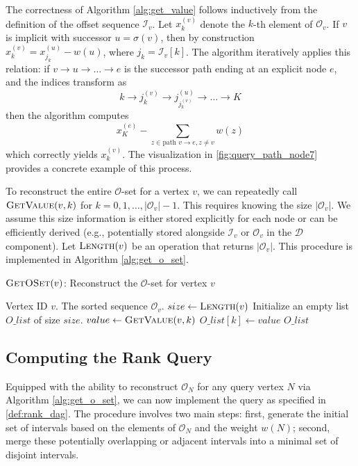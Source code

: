 The correctness of Algorithm \ref{alg:get_value} follows inductively from the definition of the offset sequence $\mathcal{I}_v$. Let $x_k^{(v)}$ denote the $k$-th element of $\mathcal{O}_v$. If $v$ is implicit with successor $u = \sigma(v)$, then by construction $x_k^{(v)} = x_{j_k}^{(u)} - w(u)$, where $j_k = \mathcal{I}_v[k]$. The algorithm iteratively applies this relation: if $v \to u \to \dots \to e$ is the successor path ending at an explicit node $e$, and the indices transform as
\[ k \to j_k^{(v)} \to j_{j_k^{(v)}}^{(u)} \to \dots \to K \]
then the algorithm computes
\[x_K^{(e)} - \sum_{z \in \text{path } v \to e, z \neq v} w(z)\]
which correctly yields $x_k^{(v)}$. The visualization in \autoref{fig:query_path_node7} provides a concrete example of this process.

To reconstruct the entire $\mathcal{O}$-set for a vertex $v$, we can repeatedly call $\textsc{GetValue}(v, k)$ for $k=0, 1, \dots, |\mathcal{O}_v|-1$. This requires knowing the size $|\mathcal{O}_v|$. We assume this size information is either stored explicitly for each node or can be efficiently derived (e.g., potentially stored alongside $\mathcal{I}_v$ or $\mathcal{O}_v$ in the $\mathcal{D}$ component). Let $\textsc{Length}(v)$ be an operation that returns $|\mathcal{O}_v|$. This procedure is implemented in Algorithm \ref{alg:get_o_set}.

\begin{algorithm}
    \caption{$\textsc{GetOSet}(v)$: Reconstruct the $\mathcal{O}$-set for vertex $v$}
    \label{alg:get_o_set}
    \small
    \begin{algorithmic}[1]
        \Require Vertex ID $v$.
        \Ensure The sorted sequence $\mathcal{O}_v$.
        \State $size \gets \textsc{Length}(v)$
        \State Initialize an empty list $O\_list$ of size $size$.
        \State $value \gets \textsc{GetValue}(v, k)$
        \State $O\_list[k] \gets value$
        \EndFor
        \State \Return $O\_list$
    \end{algorithmic}
\end{algorithm}

\subsection{Computing the Rank Query}
\label{subsec:computing_rank}

Equipped with the ability to reconstruct $\mathcal{O}_N$ for any query vertex $N$ via Algorithm \ref{alg:get_o_set}, we can now implement the \Rank{} query as specified in \ref{def:rank_dag}. The procedure involves two main steps: first, generate the initial set of intervals based on the elements of $\mathcal{O}_N$ and the weight $w(N)$; second, merge these potentially overlapping or adjacent intervals into a minimal set of disjoint intervals.

